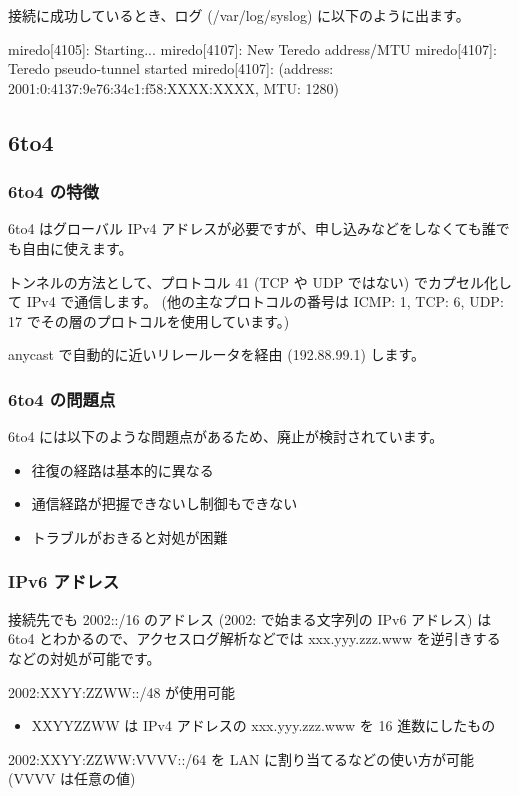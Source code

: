 \documentclass[mingoth,a4paper]{jsarticle}
\begin{document}
接続に成功しているとき、ログ (/var/log/syslog) に以下のように出ます。

\begin{commandline}
miredo[4105]: Starting...
miredo[4107]: New Teredo address/MTU
miredo[4107]: Teredo pseudo-tunnel started
miredo[4107]:  (address: 2001:0:4137:9e76:34c1:f58:XXXX:XXXX, MTU: 1280)
\end{commandline}
\subsection{6to4}

\subsubsection{6to4 の特徴}


6to4 はグローバル IPv4 アドレスが必要ですが、申し込みなどをしなくても誰でも自由に使えます。

トンネルの方法として、プロトコル 41 (TCP や UDP ではない) でカプセル化して IPv4 で通信します。
(他の主なプロトコルの番号は ICMP: 1, TCP: 6, UDP: 17 でその層のプロトコルを使用しています。)

anycast で自動的に近いリレールータを経由 (192.88.99.1) します。
\subsubsection{6to4 の問題点}

6to4 には以下のような問題点があるため、廃止が検討されています。

\begin{itemize}
\item 往復の経路は基本的に異なる
\item 通信経路が把握できないし制御もできない
\item トラブルがおきると対処が困難
\end{itemize}
\subsubsection{IPv6 アドレス}

接続先でも 2002::/16 のアドレス (2002: で始まる文字列の IPv6 アドレス) は
6to4 とわかるので、アクセスログ解析などでは xxx.yyy.zzz.www
を逆引きするなどの対処が可能です。

\begin{description}
\item 2002:XXYY:ZZWW::/48 が使用可能

\begin{itemize}
\item XXYYZZWW は IPv4 アドレスの xxx.yyy.zzz.www を 16 進数にしたもの
\end{itemize}

\item 2002:XXYY:ZZWW:VVVV::/64 を LAN に割り当てるなどの使い方が可能
  (VVVV は任意の値)
\end{description}
\end{document}

